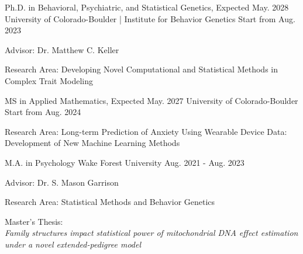 

\begin{cventries}

  \cventry
    {Ph.D. in Behavioral, Psychiatric, and Statistical Genetics, Expected May. 2028} %
    {University of Colorado-Boulder | Institute for Behavior Genetics} %
    {Start from Aug. 2023} %
    {} %
    {
      \begin{cvitems} %
        \item {Advisor: Dr. Matthew C. Keller}
        \item {Research Area: Developing Novel Computational and Statistical Methods in Complex Trait Modeling}
      \end{cvitems}
    }
      \cventry
    {MS in Applied Mathematics, Expected May. 2027} %
    {University of Colorado-Boulder} %
    {Start from Aug. 2024} %
    {} %
    {
      \begin{cvitems} %
        \item {Research Area: Long-term Prediction of Anxiety Using Wearable Device Data: Development of New Machine Learning Methods}
      \end{cvitems}
    }

  \cventry
    {M.A. in Psychology} %
    {Wake Forest University} %
    {Aug. 2021 - Aug. 2023} %
    {} %
    {
      \begin{cvitems} %
        \item {Advisor: Dr. S. Mason Garrison}
        \item {Research Area: Statistical Methods and Behavior Genetics}
        \item {Master's Thesis: \\
        \textit{Family structures impact statistical power of mitochondrial DNA effect estimation under a novel extended-pedigree model}}
      \end{cvitems}
    }
    

\end{cventries}

